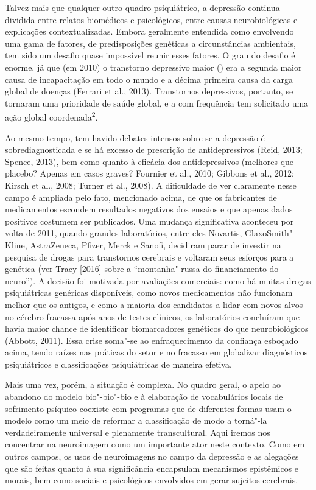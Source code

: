 Talvez mais que qualquer outro quadro psiquiátrico, a depressão continua
dividida entre relatos biomédicos e psicológicos, entre causas
neurobiológicas e explicações contextualizadas. Embora geralmente
entendida como envolvendo uma gama de fatores, de predisposições
genéticas a circunstâncias ambientais, tem sido um desafio quase
impossível reunir esses fatores. O grau do desafio é enorme, já que (em
2010) o transtorno depressivo maior () era a segunda maior causa de
incapacitação em todo o mundo e a décima primeira causa da carga global
de doenças (Ferrari et al., 2013). Transtornos depressivos, portanto, se
tornaram uma prioridade de saúde global, e a  com frequência tem
solicitado uma ação global coordenada\textsuperscript{2}.

Ao mesmo tempo, tem havido debates intensos sobre se a depressão é
sobrediagnosticada e se há excesso de prescrição de antidepressivos
(Reid, 2013; Spence, 2013), bem como quanto à eficácia dos
antidepressivos (melhores que placebo? Apenas em casos graves? Fournier
et al., 2010; Gibbons et al., 2012; Kirsch et al., 2008; Turner et al.,
2008). A dificuldade de ver claramente nesse campo é ampliada pelo fato,
mencionado acima, de que os fabricantes de medicamentos escondem
resultados negativos dos ensaios e que apenas dados positivos costumem
ser publicados. Uma mudança significativa aconteceu por volta de 2011,
quando grandes laboratórios, entre eles Novartis, GlaxoSmith"-Kline,
AstraZeneca, Pfizer, Merck e Sanofi, decidiram parar de investir na
pesquisa de drogas para transtornos cerebrais e voltaram seus esforços
para a genética (ver Tracy {[}2016{]} sobre a ``montanha"-russa do
financiamento do neuro''). A decisão foi motivada por avaliações
comerciais: como há muitas drogas psiquiátricas genéricas disponíveis,
como novos medicamentos não funcionam melhor que os antigos, e como a
maioria dos candidatos a lidar com novos alvos no cérebro fracassa após
anos de testes clínicos, os laboratórios concluíram que havia maior
chance de identificar biomarcadores genéticos do que neurobiológicos
(Abbott, 2011). Essa crise soma"-se ao enfraquecimento da confiança
esboçado acima, tendo raízes nas práticas do setor e no fracasso em
globalizar diagnósticos psiquiátricos e classificações psiquiátricas de
maneira efetiva.

Mais uma vez, porém, a situação é complexa. No quadro geral, o apelo ao
abandono do modelo bio"-bio"-bio e à elaboração de vocabulários locais de
sofrimento psíquico coexiste com programas que de diferentes formas usam
o modelo como um meio de reformar a classificação de modo a torná"-la
verdadeiramente universal e plenamente transcultural. Aqui iremos nos
concentrar na neuroimagem como um importante ator neste contexto. Como
em outros campos, os usos de neuroimagens no campo da depressão e as
alegações que são feitas quanto à sua significância encapsulam
mecanismos epistêmicos e morais, bem como sociais e psicológicos
envolvidos em gerar sujeitos cerebrais.

